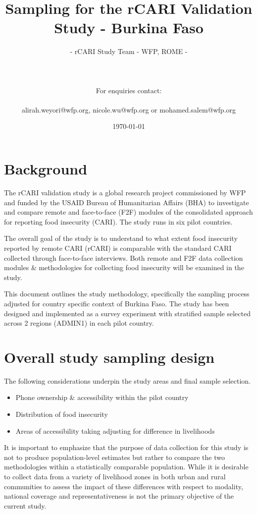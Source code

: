 \documentclass[11pt,harvard]{article}
\author{- rCARI Study Team - WFP, ROME - 	\\ \\  \\	\\For enquiries contact:\\	\\alirah.weyori@wfp.org, nicole.wu@wfp.org or mohamed.salem@wfp.org}
\date{\today}
\title{Sampling for the rCARI Validation Study - Burkina Faso}
\begin{document}
	\maketitle \vspace{-2cm}
	\onehalfspacing
	\pagebreak
	\setlength{\parskip}{8pt} %
	
\section{Background}

The rCARI validation study is a global research project commissioned by WFP and funded by the USAID Bureau of Humanitarian Affairs (BHA) to investigate and compare remote and face-to-face (F2F) modules of the consolidated approach for reporting food insecurity (CARI). The study runs in six pilot countries. 

The overall goal of the study is to understand to what extent food insecurity reported by remote CARI (rCARI) is comparable with the standard CARI collected through face-to-face interviews. Both remote and F2F data collection modules \& methodologies for collecting food insecurity will be examined in the study.

This document outlines the study methodology, specifically the sampling process adjusted for country specific context of Burkina Faso. The study has been designed and implemented as a survey experiment with stratified sample selected across 2 regions (ADMIN1) in each pilot country.
  

\section{Overall study sampling design}

The following considerations underpin the study areas and final sample selection.

\begin{itemize}[left=2.0em]
	\item Phone ownership \& accessibility within the pilot country
	\item Distribution of food insecurity
	\item Areas of accessibility taking adjusting for difference in livelihoods
\end{itemize} 

It is important to emphasize that the purpose of data collection for this study is not to produce population-level estimates but rather to compare the two methodologies within a statistically comparable population. While it is desirable to collect data from a variety of livelihood zones in both urban and rural communities to assess the impact of these differences with respect to modality, national coverage and representativeness is not the primary objective of the current study. 
\end{document}
